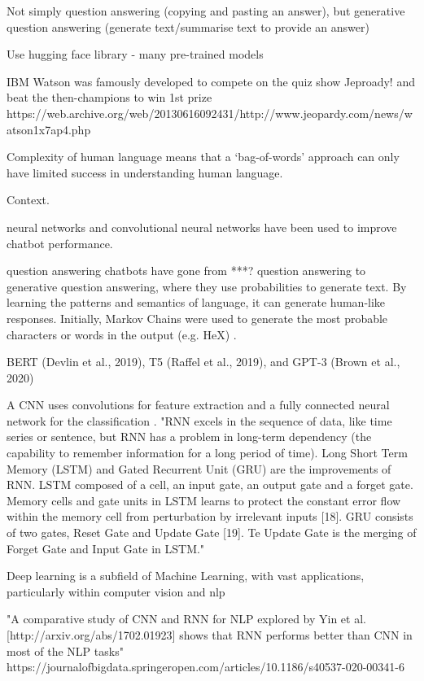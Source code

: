 Not simply question answering (copying and pasting an answer), but generative question answering (generate text/summarise text to provide an answer)

Use hugging face library - many pre-trained models

IBM Watson was famously developed to compete on the quiz show Jeproady! and beat the then-champions to win 1st prize https://web.archive.org/web/20130616092431/http://www.jeopardy.com/news/watson1x7ap4.php


 

Complexity of human language means that a `bag-of-words' approach can only have limited success in understanding human language.

Context.

neural networks and convolutional neural networks have been used to improve chatbot performance.

question answering chatbots have gone from ***? question answering to generative question answering, where they use probabilities to generate text. By learning the patterns and semantics of language, it can generate human-like responses. Initially, Markov Chains were used to generate the most probable characters or words in the output (e.g. HeX) \citep{Luka, Ahmad}. 

BERT (Devlin et al., 2019), T5 (Raffel et al., 2019), and GPT-3 (Brown et al., 2020)

A CNN uses convolutions for feature extraction and a fully connected neural network for the classification \citep{Budiharto}. "RNN excels in the sequence of data, like time series or sentence, but RNN has a problem in long-term dependency (the capability to remember information for a long period of time). Long Short Term Memory (LSTM) and Gated Recurrent Unit (GRU) are the improvements of RNN. LSTM composed of a cell, an input gate, an output gate and a forget gate. Memory cells and gate units in LSTM learns to protect the constant error flow within the memory cell from perturbation by irrelevant inputs [18]. GRU consists of two gates, Reset Gate and Update Gate [19]. Te Update Gate is the merging of Forget Gate and Input Gate in LSTM."

Deep learning is a subfield of Machine Learning, with vast applications, particularly within computer vision and \acrshort{nlp}

"A comparative study of CNN and RNN for NLP explored by Yin et  al. [http://arxiv.org/abs/1702.01923] shows that RNN performs better than CNN in most of the NLP tasks" https://journalofbigdata.springeropen.com/articles/10.1186/s40537-020-00341-6


